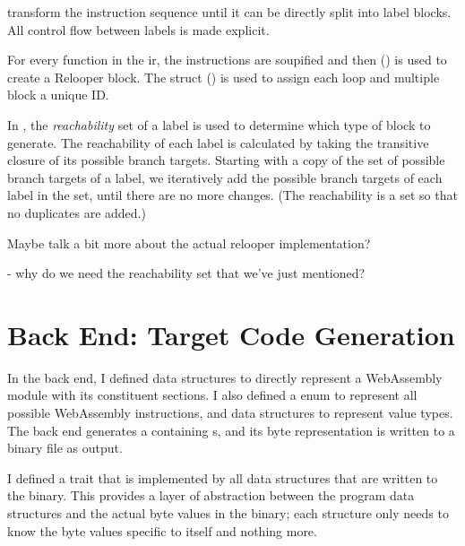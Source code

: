 \documentclass[00-main.tex]{subfiles}
\begin{document}
 transform the instruction sequence until it can be directly split into label blocks.
All control flow between labels is made explicit.

For every function in the \gls{ir}, the instructions are soupified and then  () is used to create a Relooper block.
The  struct () is used to assign each loop and multiple block a unique ID\@.

In , the \emph{reachability} set of a label is used to determine which type of block to generate.
The reachability of each label is calculated by taking the transitive closure of its possible branch targets.
Starting with a copy of the set of possible branch targets of a label, we iteratively add the possible branch targets of each label in the set, until there are no more changes.
(The reachability is a set so that no duplicates are added.)

\begin{mrwComment}
  Maybe talk a bit more about the actual relooper implementation?

  - why do we need the reachability set that we've just mentioned?
\end{mrwComment}

\section{Back End: Target Code Generation}\label{sec:impl:back end}

In the back end, I defined data structures to directly represent a WebAssembly module with its constituent sections.
I also defined a  enum to represent all possible WebAssembly instructions, and data structures to represent value types.
The back end generates a  containing s, and its byte representation is written to a binary file as output.

I defined a  trait that is implemented by all data structures that are written to the binary.
This provides a layer of abstraction between the program data structures and the actual byte values in the binary; each structure only needs to know the byte values specific to itself and nothing more.
\end{document}
